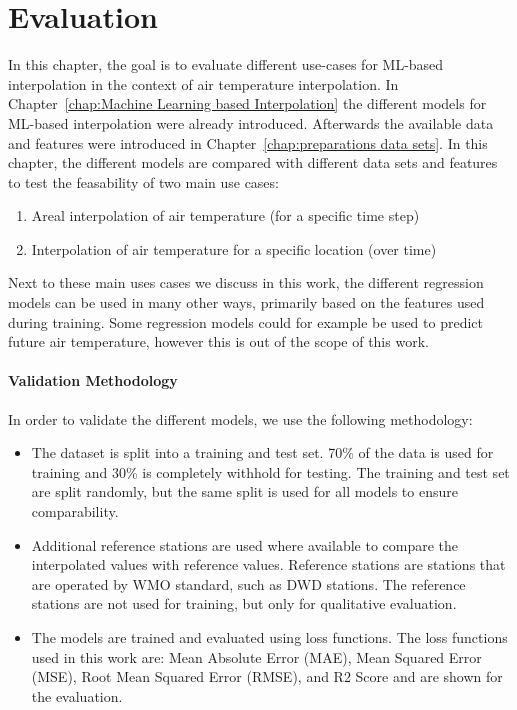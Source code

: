 \chapter{Evaluation}
\label{chap:Evaluation}


In this chapter, the goal is to evaluate different use-cases for ML-based interpolation in the context of air temperature interpolation. In Chapter~\ref{chap:Machine Learning based Interpolation} the different models for ML-based interpolation were already introduced. Afterwards the available data and features were introduced in Chapter~\ref{chap:preparations data sets}. In this chapter, the different models are compared with different data sets and features to test the feasability of two main use cases:

\begin{enumerate}
  \item Areal interpolation of air temperature (for a specific time step)
  \item Interpolation of air temperature for a specific location (over time)
\end{enumerate}

Next to these main uses cases we discuss in this work, the different regression models can be used in many other ways, primarily based on the features used during training. Some regression models could for example be used to predict future air temperature, however this is out of the scope of this work.

\subsubsection{Validation Methodology}

In order to validate the different models, we use the following methodology:

\begin{itemize}
  \item The dataset is split into a training and test set. 70\% of the data is used for training and 30\% is completely withhold for testing. The training and test set are split randomly, but the same split is used for all models to ensure comparability.
  \item Additional reference stations are used where available to compare the interpolated values with reference values. Reference stations are stations that are operated by WMO standard, such as DWD stations. The reference stations are not used for training, but only for qualitative evaluation.
  \item The models are trained and evaluated using loss functions. The loss functions used in this work are: Mean Absolute Error (MAE), Mean Squared Error (MSE), Root Mean Squared Error (RMSE), and R2 Score and are shown for the evaluation.
\end{itemize}

